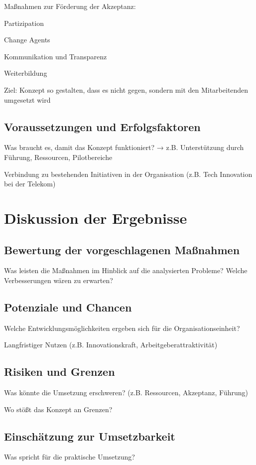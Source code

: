 \documentclass[12pt,a4paper]{article}
\begin{document}
	Maßnahmen zur Förderung der Akzeptanz:
	
	Partizipation
	
	Change Agents
	
	Kommunikation und Transparenz
	
	Weiterbildung
	
	Ziel: Konzept so gestalten, dass es nicht gegen, sondern mit den Mitarbeitenden umgesetzt wird
	
	\subsection{Voraussetzungen und Erfolgsfaktoren}
	Was braucht es, damit das Konzept funktioniert?
	→ z.B. Unterstützung durch Führung, Ressourcen, Pilotbereiche
	
	Verbindung zu bestehenden Initiativen in der Organisation (z.B. Tech  Innovation bei der Telekom)
	
	\section{Diskussion der Ergebnisse}
	\subsection{Bewertung der vorgeschlagenen Maßnahmen}
	
	Was leisten die Maßnahmen im Hinblick auf die analysierten Probleme?
	Welche Verbesserungen wären zu erwarten?
	\subsection{Potenziale und Chancen}
	Welche Entwicklungsmöglichkeiten ergeben sich für die Organisationseinheit?
	
	Langfristiger Nutzen (z.B. Innovationskraft, Arbeitgeberattraktivität)
	\subsection{Risiken und Grenzen}
	Was könnte die Umsetzung erschweren? (z.B. Ressourcen, Akzeptanz, Führung)
	
	Wo stößt das Konzept an Grenzen?
	
	\subsection{Einschätzung zur Umsetzbarkeit}
	Was spricht für die praktische Umsetzung?
	
\end{document}
